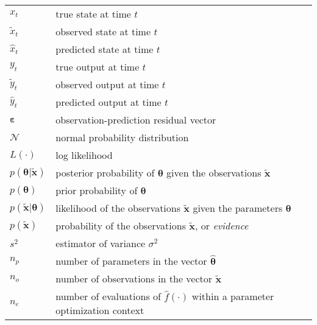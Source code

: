 \begin{center}
\begin{longtable}{lp{10cm}}
$x_t$&true state at time $t$\\
$\tilde{x}_t$&observed state at time $t$\\
$\hat{x}_t$&predicted state at time $t$\\
$y_t$&true output at time $t$\\
$\tilde{y}_t$&observed output at time $t$\\
$\hat{y}_t$&predicted output at time $t$\\
$\boldsymbol\varepsilon$&observation-prediction residual vector\\
$\mathcal{N}$&normal probability distribution\\
$L(\cdot{})$&log likelihood\\
$p(\boldsymbol\theta|\tilde{\mathbf{x}})$&posterior probability of $\boldsymbol{\theta}$ given the observations $\tilde{\mathbf{x}}$\\
$p(\boldsymbol\theta)$&prior probability of $\boldsymbol{\theta}$\\
$p(\tilde{\mathbf{x}}|\boldsymbol\theta)$&likelihood of the observations $\tilde{\mathbf{x}}$ given the parameters $\boldsymbol{\theta}$\\
$p(\tilde{\mathbf{x}})$&probability of the observations $\tilde{\mathbf{x}}$, or \textit{evidence}\\
$s^2$&estimator of variance $\sigma^2$\\
$n_p$&number of parameters in the vector $\hat{\boldsymbol{\theta}}$\\
$n_o$&number of observations in the vector $\tilde{\mathbf{x}}$\\
$n_e$&number of evaluations of $\hat{f}(\cdot{})$ within a parameter optimization context\\
\end{longtable}
\end{center}



